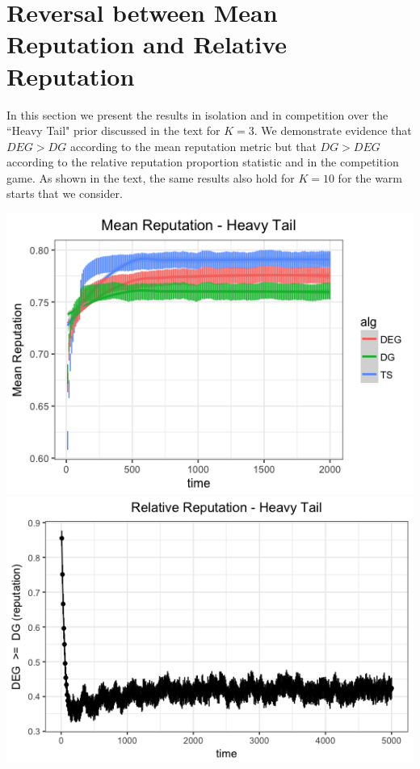 \documentclass[11pt,letterpaper]{article}
\begin{document}
\pagebreak
\section{Reversal between Mean Reputation and Relative Reputation}

In this section we present the results in isolation and in competition over the ``Heavy Tail" prior discussed in the text for $K = 3$. We demonstrate evidence that $DEG > DG$ according to the mean reputation metric but that $DG > DEG$ according to the relative reputation proportion statistic and in the competition game. As shown in the text, the same results also hold for $K = 10$ for the warm starts that we consider.

\begin{center}
\includegraphics[scale=0.5]{figures/mean_ht_3_arms} \\
\includegraphics[scale=0.5]{figures/rel_rep_ht_3_arms}
\end{center}
\end{document}
